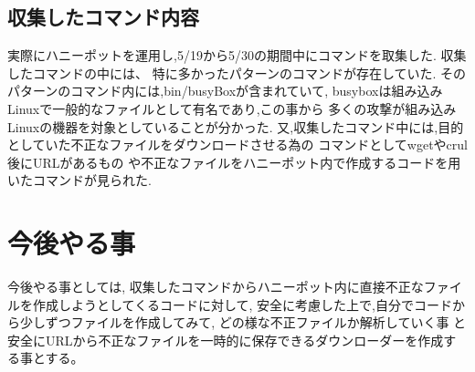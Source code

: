 \documentclass{entry}
\begin{document}
\subsection{収集したコマンド内容}
実際にハニーポットを運用し,5/19から5/30の期間中にコマンドを取集した.
収集したコマンドの中には、
特に多かったパターンのコマンドが存在していた.
そのパターンのコマンド内には,bin/busyBoxが含まれていて,
busyboxは組み込みLinuxで一般的なファイルとして有名であり,この事から
多くの攻撃が組み込みLinuxの機器を対象としていることが分かった.
又,収集したコマンド中には,目的としていた不正なファイルをダウンロードさせる為の
コマンドとしてwgetやcrul後にURLがあるもの
や不正なファイルをハニーポット内で作成するコードを用いたコマンドが見られた.


\section{今後やる事}
今後やる事としては,
収集したコマンドからハニーポット内に直接不正なファイルを作成しようとしてくるコードに対して,
安全に考慮した上で,自分でコードから少しずつファイルを作成してみて,
どの様な不正ファイルか解析していく事
と安全にURLから不正なファイルを一時的に保存できるダウンローダーを作成する事とする。







%

\end{document}
